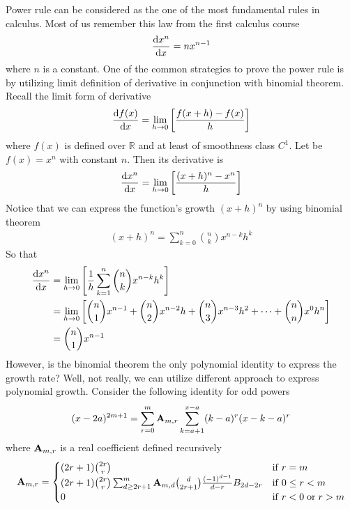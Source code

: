 Power rule can be considered as the one of the most fundamental rules in calculus.
Most of us remember this law from the first calculus course
\begin{align*}
    \odv{x^n}{x} = nx^{n-1}
\end{align*}
where $n$ is a constant.
One of the common strategies to prove the power rule is by utilizing limit definition
of derivative in conjunction with binomial theorem.
Recall the limit form of derivative
\begin{align*}
    \odv{f(x)}{x} = \lim_{h \to 0} \left[ \frac{f(x+h) - f(x)}{h} \right]
\end{align*}
where $f(x)$ is defined over $\mathbb{R}$ and at least of smoothness class $C^1$.
Let be $f(x) = x^n$ with constant $n$.
Then its derivative is
\begin{align*}
    \odv{x^n}{x} = \lim_{h \to 0} \left[ \frac{(x+h)^n - x^n}{h} \right]
\end{align*}
Notice that we can express the function's growth $(x+h)^n$ by using binomial theorem
\begin{align*}
(x+h)
    ^n = \sum_{k=0}^{n} \binom{n}{k} x^{n-k} h^k
\end{align*}
So that
\begin{align*}
    \odv{x^n}{x} &= \lim_{h \to 0} \left[ \frac{1}{h} \sum_{k=1}^{n} \binom{n}{k} x^{n-k} h^k \right] \\
    &= \lim_{h \to 0} \left[ \binom{n}{1} x^{n-1} +  \binom{n}{2} x^{n-2} h
    + \binom{n}{3} x^{n-3} h^2 + \dots + \binom{n}{n} x^{0} h^n \right] \\
    &= \binom{n}{1} x^{n-1}
\end{align*}
However, is the binomial theorem the only polynomial identity to express the growth rate?
Well, not really, we can utilize different approach to express polynomial growth.
Consider the following identity for odd powers~\cite{kolosov2024history, kolosov2016link, kolosov2022106, kolosov2023polynomial}
\begin{equation}
(x-2a)
    ^{2m+1} = \sum_{r=0}^{m} {\mathbf{A}} \sb{m,r} \sum_{k=a+1}^{x-a} (k-a)^r (x-k-a)^r
    \label{eq:odd-power-identity}
\end{equation}
where ${\mathbf{A}} \sb{m,r}$ is a real coefficient defined recursively
\begin{equation}
    \label{eq:definition_coefficient_a}
    {\mathbf{A}} \sb{m,r} =
    \begin{cases}
    (2r+1)
        \binom{2r}{r} & \mathrm{if} \; r=m \\
        (2r+1) \binom{2r}{r} \sum_{d \geq 2r+1}^{m} {\mathbf{A}} \sb{m,d} \binom{d}{2r+1} \frac{(-1)^{d-1}}{d-r}
        {B}\sb{2d-2r} & \mathrm{if} \; 0 \leq r<m \\
        0 & \mathrm{if} \; r<0 \; \mathrm{or} \; r>m
    \end{cases}
\end{equation}
